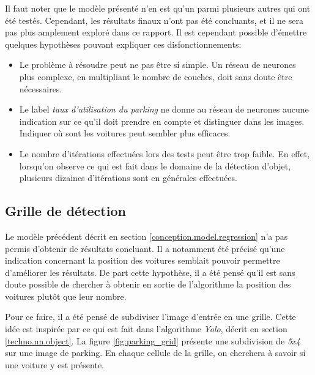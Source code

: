 Il faut noter que le modèle présenté n'en est qu'un parmi plusieurs autres qui ont été testés. Cependant, les résultats finaux n'ont pas été concluants, et il ne sera pas plus amplement exploré dans ce rapport. Il est cependant possible d'émettre quelques hypothèses pouvant expliquer ces disfonctionnements:

\begin{itemize}
    \item Le problème à résoudre peut ne pas être si simple. Un réseau de neurones plus complexe, en multipliant le nombre de couches, doit sans doute être nécessaires. 
    \item Le label \textit{taux d'utilisation du parking} ne donne au réseau de neurones aucune indication sur ce qu'il doit prendre en compte et distinguer dans les images. Indiquer où sont les voitures peut sembler plus efficaces.
    \item Le nombre d'itérations effectuées lors des tests peut être trop faible. En effet, lorsqu'on observe ce qui est fait dans le domaine de la détection d'objet, plusieurs dizaines d'itérations sont en générales effectuées. 
\end{itemize}

\subsection{Grille de détection} 
Le modèle précédent décrit en section \ref{conception.model.regression} n'a pas permis d'obtenir de résultats concluant. Il a notamment été précisé qu'une indication concernant la position des voitures semblait pouvoir permettre d'améliorer les résultats. De part cette hypothèse, il a été pensé qu'il est sans doute possible de chercher à obtenir en sortie de l'algorithme la position des voitures plutôt que leur nombre.

Pour ce faire, il a été pensé de subdiviser l'image d'entrée en une grille. Cette idée est inspirée par ce qui est fait dans l'algorithme \textit{Yolo}, décrit en section \ref{techno.nn.object}. La figure \ref{fig:parking_grid} présente une subdivision de \textit{5x4} sur une image de parking. En chaque cellule de la grille, on cherchera à savoir si une voiture y est présente. 

